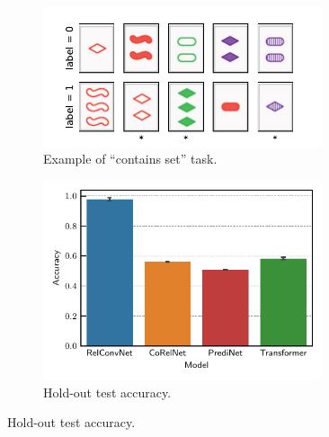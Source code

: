 \begin{figure}[ht]
    \centering
    \begin{subfigure}[t]{0.5\textwidth}
        \centering
        \includegraphics[width=0.9\textwidth]{figs/contains_set_example.pdf}
        \caption{Example of ``contains set'' task.}\label{fig:contains_set_example}
    \end{subfigure}
    \begin{subfigure}[t]{0.4\textwidth}
        \centering
        \includegraphics[width=0.9\textwidth]{figs/experiments/contains_set_acc.pdf}
        \caption{\footnotesize{Hold-out test accuracy.}}\label{fig:contains_set_acc}
    \end{subfigure}


\end{figure}

